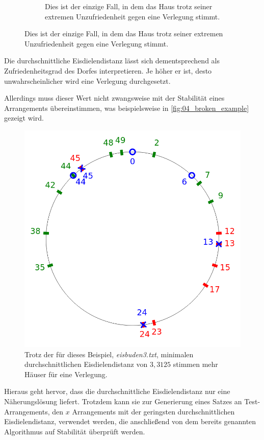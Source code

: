 \documentclass[a4paper,10pt,ngerman,captions=figureheading]{scrartcl}
\newcommand{\imageWidth}{0.3\linewidth}
\begin{document}
\begin{figure}[ht]
\begin{subfigure}[t]{\imageWidth}
        \caption{Dies ist der einzige Fall, in dem das Haus trotz seiner extremen Unzufriedenheit gegen eine Verlegung stimmt.}
        \label{fig:03_slightly_happy_house}
    \end{subfigure}
\end{figure}

Die durchschnittliche Eisdielendistanz lässt sich dementsprechend als \glqq Zufriedenheitsgrad\grqq{} des Dorfes interpretieren.
Je höher er ist, desto unwahrscheinlicher wird eine Verlegung durchgesetzt.

Allerdings muss dieser Wert nicht zwangsweise mit der Stabilität eines Arrangements übereinstimmen, was beispielsweise in \autoref{fig:04_broken_example} gezeigt wird.

\begin{figure}[ht]
    \centering
    \caption{Trotz der für dieses Beispiel, \textit{eisbuden3.txt}, minimalen durchschnittlichen Eisdielendistanz von $3,3125$ stimmen mehr Häuser für eine Verlegung.}
    \label{fig:04_broken_example}
    \includegraphics[width=\imageWidth]{04_broken_example.png}
\end{figure}

Hieraus geht hervor, dass die durchschnittliche Eisdielendistanz nur eine Näherungslösung liefert.
Trotzdem kann sie zur Generierung eines Satzes an Test-Arrangements, den $x$ Arrangements mit der geringsten durchschnittlichen Eisdielendistanz, verwendet werden, die anschließend von dem bereits genannten Algorithmus auf Stabilität überprüft werden.
\end{document}
